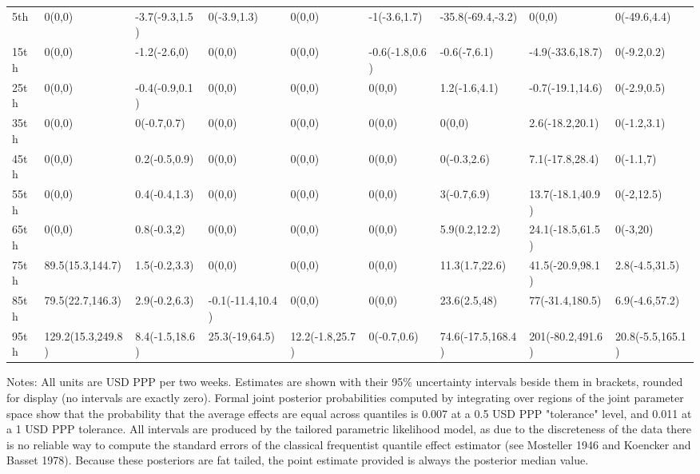 \documentclass[AER]{AEA}
\begin{document}
\begin{table}[!htbp]
\begin{tabular}{@{\extracolsep{0pt}} lllllllll}
 5th & 0(0,0) & -3.7(-9.3,1.5) & 0(-3.9,1.3) & 0(0,0) & -1(-3.6,1.7) & -35.8(-69.4,-3.2) & 0(0,0) & 0(-49.6,4.4) \\ 
15th & 0(0,0) & -1.2(-2.6,0) & 0(0,0) & 0(0,0) & -0.6(-1.8,0.6) & -0.6(-7,6.1) & -4.9(-33.6,18.7) & 0(-9.2,0.2) \\ 
 25th & 0(0,0) & -0.4(-0.9,0.1) & 0(0,0) & 0(0,0) & 0(0,0) & 1.2(-1.6,4.1) & -0.7(-19.1,14.6) & 0(-2.9,0.5) \\ 
35th & 0(0,0) & 0(-0.7,0.7) & 0(0,0) & 0(0,0) & 0(0,0) & 0(0,0) & 2.6(-18.2,20.1) & 0(-1.2,3.1) \\ 
45th & 0(0,0) & 0.2(-0.5,0.9) & 0(0,0) & 0(0,0) & 0(0,0) & 0(-0.3,2.6) & 7.1(-17.8,28.4) & 0(-1.1,7) \\ 
 55th & 0(0,0) & 0.4(-0.4,1.3) & 0(0,0) & 0(0,0) & 0(0,0) & 3(-0.7,6.9) & 13.7(-18.1,40.9) & 0(-2,12.5) \\ 
 65th & 0(0,0) & 0.8(-0.3,2) & 0(0,0) & 0(0,0) & 0(0,0) & 5.9(0.2,12.2) & 24.1(-18.5,61.5) & 0(-3,20) \\ 
 75th & 89.5(15.3,144.7) & 1.5(-0.2,3.3) & 0(0,0) & 0(0,0) & 0(0,0) & 11.3(1.7,22.6) & 41.5(-20.9,98.1) & 2.8(-4.5,31.5) \\ 
85th & 79.5(22.7,146.3) & 2.9(-0.2,6.3) & -0.1(-11.4,10.4) & 0(0,0) & 0(0,0) & 23.6(2.5,48) & 77(-31.4,180.5) & 6.9(-4.6,57.2) \\ 
95th & 129.2(15.3,249.8) & 8.4(-1.5,18.6) & 25.3(-19,64.5) & 12.2(-1.8,25.7) & 0(-0.7,0.6) & 74.6(-17.5,168.4) & 201(-80.2,491.6) & 20.8(-5.5,165.1) \\ 


\end{tabular}
\raggedright{\scriptsize Notes: All units are USD PPP per two weeks. Estimates are shown with their 95\% uncertainty intervals beside them in brackets, rounded for display (no intervals are exactly zero). Formal joint posterior probabilities computed by integrating over regions of the joint parameter space show that the probability that the average effects are equal across quantiles is 0.007 at a 0.5 USD PPP "tolerance" level, and 0.011 at a 1 USD PPP tolerance. All intervals are produced by the tailored parametric likelihood model, as due to the discreteness of the data there is no reliable way to compute the standard errors of the classical frequentist quantile effect estimator (see Mosteller 1946 and Koencker and Basset 1978). Because these posteriors are fat tailed, the point estimate provided is always the posterior median value. }

\end{table}
\end{document}

